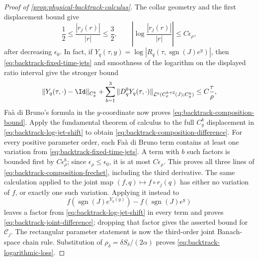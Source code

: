 \begin{proof}[Proof of \cref{prop:physical-backtrack-calculus}]
The collar geometry and the first displacement bound give
\begin{equation}
 \frac12\le\frac{|r_j(r)|}{|r|}\le\frac32,\qquad
 \left|\log\frac{|r_j(r)|}{|r|}\right|
 \le C\epsilon_\rho,                               \label{eq:backtrack-log-shift}
\end{equation}
after decreasing \(\epsilon_0\).  In fact, if
\(Y_q(\tau,y)=\log|R_q(\tau,\operatorname{sgn}(J)e^y)|\), then
\cref{eq:backtrack-fixed-time-jets} and smoothness of the logarithm on the
displayed ratio interval give the stronger bound
\begin{equation}
 \|Y_q(\tau,\cdot)-\Id\|_{C^k_y}
 +\sum_{b=1}^3\|D_q^bY_q(\tau,\cdot)\|_{
      \mathcal L^b(C^{k+2}_\rho(J);C^k_y)}
 \le C\frac{\tau}{\rho},                           \label{eq:backtrack-log-jet-shift}
\end{equation}
Fa\`a di Bruno's formula in the \(y\)-coordinate now proves
\cref{eq:backtrack-composition-bound}.  Apply the fundamental theorem of
calculus to the full \(C^k_y\) displacement in
\cref{eq:backtrack-log-jet-shift} to obtain
\cref{eq:backtrack-composition-difference}.  For every positive parameter
order, each Fa\`a di Bruno term contains at least one variation from
\cref{eq:backtrack-fixed-time-jets}.  A term with \(b\) such factors is
bounded first by \(C\epsilon_\rho^b\); since
\(\epsilon_\rho\le\epsilon_0\), it is at most \(C\epsilon_\rho\).
This proves all three lines of
\cref{eq:backtrack-composition-frechet}, including the third derivative.
The same calculation applied to the joint map \((f,q)\mapsto f\circ r_j(q)\)
has either no variation of \(f\), or exactly one such variation.  Applying it
instead to
\[
 f(\operatorname{sgn}(J)e^{Y_q(y)})
   -f(\operatorname{sgn}(J)e^y)
\]
leaves a factor from \cref{eq:backtrack-log-jet-shift} in every term and
proves \cref{eq:backtrack-joint-difference}; dropping that factor gives the
asserted bound for \(\mathcal C_j\).  The rectangular parameter statement is
now the third-order joint Banach-space chain rule.  Substitution of
\(\rho_\delta=\delta S_\delta/(2\alpha)\) proves
\cref{eq:backtrack-logarithmic-loss}.
\end{proof}

